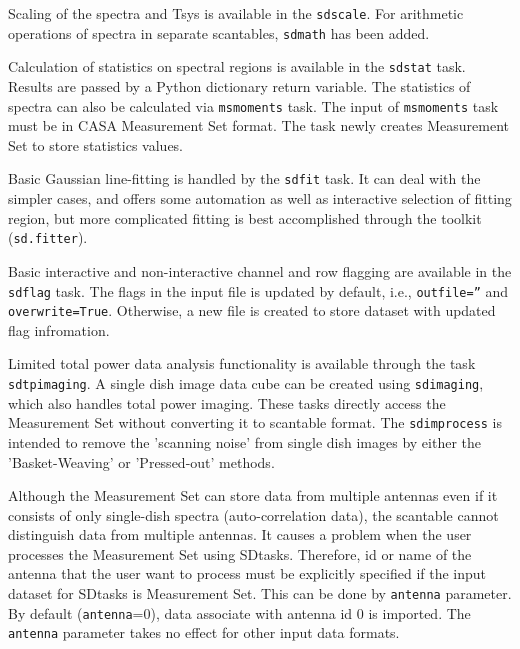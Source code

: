Scaling of the spectra and Tsys is available in the {\tt sdscale}.
For arithmetic operations of spectra in separate scantables, {\tt sdmath}
has been added. 

Calculation of statistics on spectral regions is available in the {\tt sdstat} task.
Results are passed by a Python dictionary return variable.
The statistics of spectra can also be calculated via {\tt msmoments} task.
The input of {\tt msmoments} task must be in CASA Measurement Set format.
The task newly creates Measurement Set to store statistics values.

Basic Gaussian line-fitting is handled by the {\tt sdfit} task.  It can deal
with the simpler cases, and offers some automation as well as interactive 
selection of fitting region, but more complicated
fitting is best accomplished through the toolkit ({\tt sd.fitter}).

Basic interactive and non-interactive channel and row flagging are available 
in the {\tt sdflag} task. 
The flags in the input file is updated by default, i.e., {\tt outfile=''} 
and {\tt overwrite=True}. Otherwise, a new file is created to store dataset
with updated flag infromation.

Limited total power data analysis functionality is available through 
the task {\tt sdtpimaging}. A single dish image data cube can be created
using  {\tt sdimaging}, which also handles total power imaging.
These tasks directly access the Measurement Set without converting it to scantable format.
The {\tt sdimprocess} is intended to remove the 'scanning noise' from single dish
images by either the 'Basket-Weaving' or 'Pressed-out' methods.

Although the Measurement Set can store data from multiple antennas
even if it consists of only single-dish spectra (auto-correlation data),
the scantable cannot distinguish data from multiple antennas. It causes
a problem when the user processes the Measurement Set using SDtasks.
Therefore, id or name of the antenna that the user want to process
must be explicitly specified if the input dataset for SDtasks is
Measurement Set. This can be done by {\tt antenna} parameter. By default
({\tt antenna}=0), data associate with antenna id 0 is imported.
The {\tt antenna} parameter takes no effect for other input data formats.


